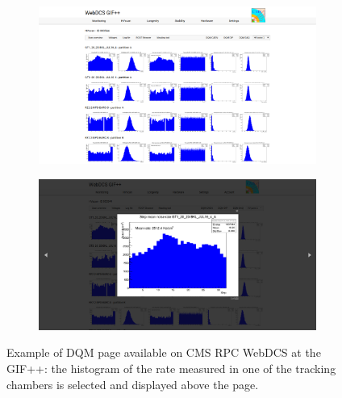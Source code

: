 	\begin{figure}[H]
    	\begin{subfigure}{\linewidth}
			\centering
    		\includegraphics[width = .9\linewidth]{fig/chapt5/GIFpp-DQM-DAQ-fullpage.png}
        	\caption{\label{fig:DQM-DAQ:A}}
    	\end{subfigure}
    	\begin{subfigure}{\linewidth}
			\centering
    		\includegraphics[width = .9\linewidth]{fig/chapt5/GIFpp-DQM-DAQ.png}
        	\caption{\label{fig:DQM-DAQ:B}}
    	\end{subfigure}
		\caption{\label{fig:DQM-DAQ} Example of DQM page available on CMS RPC WebDCS at the GIF++: the histogram of the rate measured in one of the tracking chambers is selected and displayed above the page.}
	\end{figure}
		
